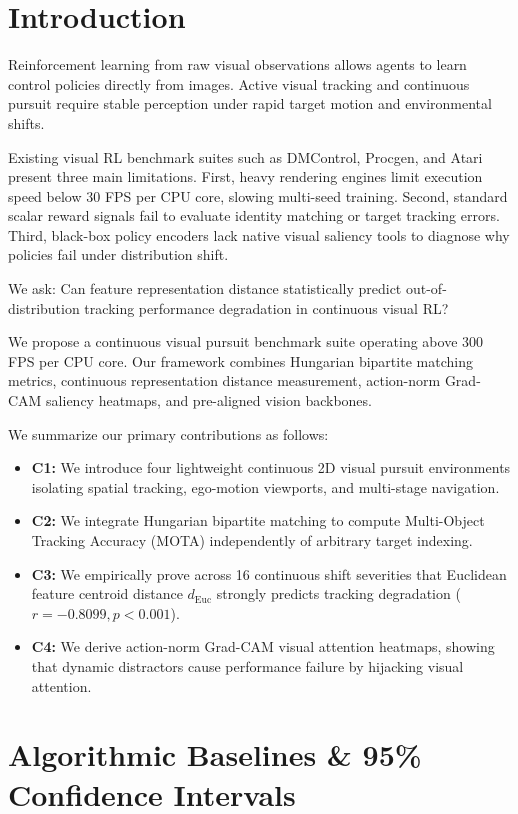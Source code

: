 \documentclass[journal]{IEEEtran}
\begin{document}
\section{Introduction}

Reinforcement learning from raw visual observations allows agents to learn control policies directly from images. Active visual tracking and continuous pursuit require stable perception under rapid target motion and environmental shifts.

Existing visual RL benchmark suites such as DMControl, Procgen, and Atari present three main limitations. First, heavy rendering engines limit execution speed below 30 FPS per CPU core, slowing multi-seed training. Second, standard scalar reward signals fail to evaluate identity matching or target tracking errors. Third, black-box policy encoders lack native visual saliency tools to diagnose why policies fail under distribution shift.

We ask: Can feature representation distance statistically predict out-of-distribution tracking performance degradation in continuous visual RL?

We propose a continuous visual pursuit benchmark suite operating above 300 FPS per CPU core. Our framework combines Hungarian bipartite matching metrics, continuous representation distance measurement, action-norm Grad-CAM saliency heatmaps, and pre-aligned vision backbones.

We summarize our primary contributions as follows:
\begin{itemize}
    \item \textbf{C1:} We introduce four lightweight continuous 2D visual pursuit environments isolating spatial tracking, ego-motion viewports, and multi-stage navigation.
    \item \textbf{C2:} We integrate Hungarian bipartite matching to compute Multi-Object Tracking Accuracy (MOTA) independently of arbitrary target indexing.
    \item \textbf{C3:} We empirically prove across 16 continuous shift severities that Euclidean feature centroid distance $d_{\text{Euc}}$ strongly predicts tracking degradation ($r = -0.8099, p < 0.001$).
    \item \textbf{C4:} We derive action-norm Grad-CAM visual attention heatmaps, showing that dynamic distractors cause performance failure by hijacking visual attention.
\end{itemize}

\section{Algorithmic Baselines \& 95\% Confidence Intervals}
\end{document}
